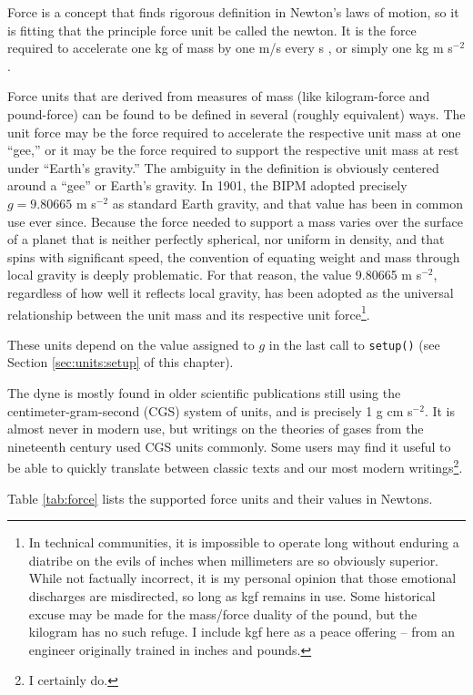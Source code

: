 Force is a concept that finds rigorous definition in Newton's laws of motion, so it is fitting that the principle force unit be called the newton.  It is the force required to accelerate one kg of mass by one m/s every s \cite[p.137]{si:2019}, or simply one kg m s$^{-2}$.

Force units that are derived from measures of mass (like kilogram-force and pound-force) can be found to be defined in several (roughly equivalent) ways.  The unit force may be the force required to accelerate the respective unit mass at one ``gee,'' or it may be the force required to support the respective unit mass at rest under ``Earth's gravity.''  The ambiguity in the definition is obviously centered around a ``gee'' or Earth's gravity.  In 1901, the BIPM adopted precisely $g = 9.80665$ m s$^{-2}$ as standard Earth gravity\cite{cgpm:3:2}, and that value has been in common use ever since.  Because the force needed to support a mass varies over the surface of a planet that is neither perfectly spherical, nor uniform in density, and that spins with significant speed, the convention of equating weight and mass through local gravity is deeply problematic.  For that reason, the value 9.80665 m s$^{-2}$, regardless of how well it reflects local gravity, has been adopted as the universal relationship between the unit mass and its respective unit force\footnote{In technical communities, it is impossible to operate long without enduring a diatribe on the evils of inches when millimeters are so obviously superior.  While not factually incorrect, it is my personal opinion that those emotional discharges are misdirected, so long as kgf remains in use.  Some historical excuse may be made for the mass/force duality of the pound, but the kilogram has no such refuge.  I include kgf here as a peace offering -- from an engineer originally trained in inches and pounds.}.

These units depend on the value assigned to $g$ in the last call to \verb|setup()| (see Section \ref{sec:units:setup} of this chapter).

The dyne is mostly found in older scientific publications still using the centimeter-gram-second (CGS) system of units, and is precisely 1 g cm s$^{-2}$.  It is almost never in modern use, but writings on the theories of gases from the nineteenth century used CGS units commonly.  Some users may find it useful to be able to quickly translate between classic texts and our most modern writings\footnote{I certainly do.}.

Table \ref{tab:force} lists the supported force units and their values in Newtons.

